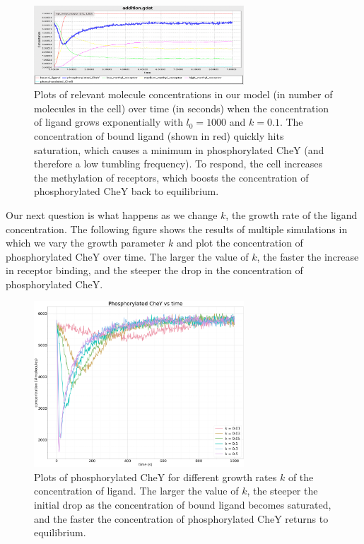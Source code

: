 \begin{figure}[h]
\centering
\mySfFamily
\includegraphics[width = 0.7\textwidth]{../images/chemotaxis_tutorial_addition01.png}
\caption{Plots of relevant molecule concentrations in our model (in number of molecules in the cell) over time (in seconds) when the concentration of ligand grows exponentially with $l_0 = 1000$ and $k = 0.1$. The concentration of bound ligand (shown in red) quickly hits saturation, which causes a minimum in phosphorylated CheY (and therefore a low tumbling frequency). To respond, the cell increases the methylation of receptors, which boosts the concentration of phosphorylated CheY back to equilibrium.}
\label{fig:chemotaxis_tutorial_addition01}
\end{figure}


Our next question is what happens as we change $k$, the growth rate of the ligand concentration. The following figure shows the results of multiple simulations in which we vary the growth parameter $k$ and plot the concentration of phosphorylated CheY over time. The larger the value of $k$, the faster the increase in receptor binding, and the steeper the drop in the concentration of phosphorylated CheY.

\begin{figure}[h]
\centering
\mySfFamily
\includegraphics[width = 0.7\textwidth]{../images/chemotaxis_tutorial_addition03.png}
\caption{Plots of phosphorylated CheY for different growth rates $k$ of the concentration of ligand. The larger the value of $k$, the steeper the initial drop as the concentration of bound ligand becomes saturated, and the faster the concentration of phosphorylated CheY returns to equilibrium.}
\label{fig:chemotaxis_tutorial_addition03}
\end{figure}

